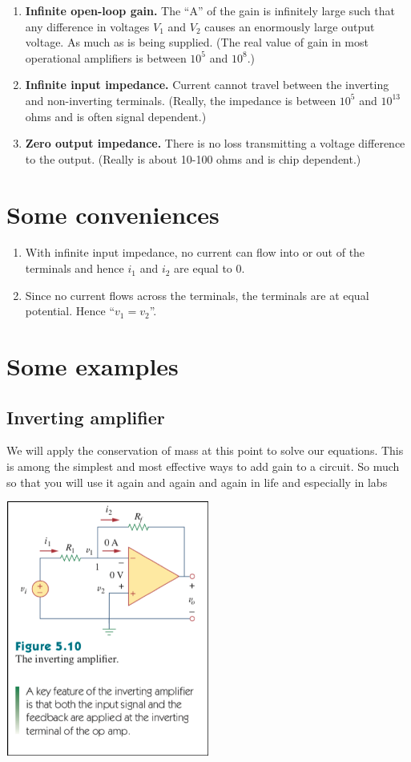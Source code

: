 \documentclass[11pt]{book}
\begin{document}
\begin{enumerate}
	\item \textbf{Infinite open-loop gain.} The ``A'' of the gain is infinitely large such that any difference in voltages $V_1$ and $V_2$ causes an enormously large output voltage. As much as is being supplied. (The real value of gain in most operational amplifiers is between $10^{5}$ and $10^8$.)
	\item \textbf{Infinite input impedance.} Current cannot travel between the inverting and non-inverting terminals. (Really, the impedance is between $10^5$ and $10^13$ ohms and is often signal dependent.)
	\item \textbf{Zero output impedance.} There is no loss transmitting a voltage difference to the output. (Really is about 10-100 ohms and is chip dependent.)
\end{enumerate}

\section{Some conveniences}
\begin{enumerate}
	\item With infinite input impedance, no current can flow into or out of the terminals and hence $i_1$ and $i_2$ are equal to 0.
	\item Since no current flows across the terminals, the terminals are at equal potential. Hence ``$v_1 = v_2$''.
\end{enumerate}

\newpage
\section{Some examples}

\subsection{Inverting amplifier}
We will apply the conservation of mass at this point to solve our equations.  This is among the simplest and most effective ways to add gain to a circuit. So much so that you will use it again and again and again in life and especially in labs

\includegraphics[width=0.5\textwidth]{figures/op-amp3}
\end{document}
